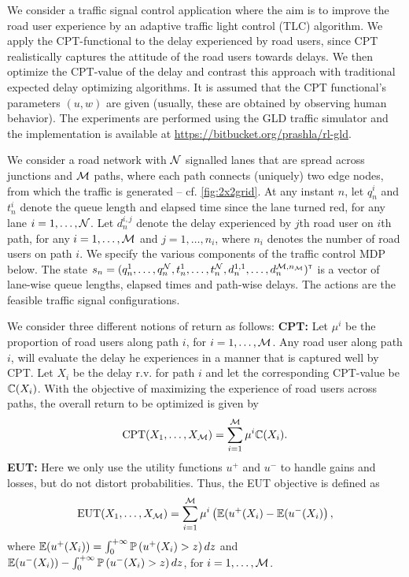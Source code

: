 We consider a traffic signal control application where the aim is to improve the road user experience by an adaptive traffic light control (TLC) algorithm.
We apply the CPT-functional to the delay experienced by road users, since CPT realistically captures the attitude of the road users towards delays. We then optimize the CPT-value of the delay and contrast this approach with traditional expected delay optimizing algorithms. It is assumed that the CPT functional's parameters $(u,w)$ are given (usually, these are obtained by observing human behavior). The experiments are performed using the GLD traffic simulator \cite{GLDSim} and the implementation is available at \url{https://bitbucket.org/prashla/rl-gld}.

We consider a road network with $\mathcal{N}$ signalled lanes that are spread across junctions and $\mathcal{M}$ paths, where each path connects (uniquely) two edge nodes, from which the traffic is generated -- cf. \cref{fig:2x2grid}. 
At any instant $n$, let $q_n^i$ and $t_n^i$ denote the queue length and elapsed time since the lane turned red, for any lane $i = 1,\ldots, \mathcal{N}$. Let $d_n^{i,j}$ denote the delay experienced by $j$th road user on $i$th path, for any $i=1,\ldots,\mathcal{M}$ and $j=1,\ldots,n_i$, where $n_i$ denotes the number of road users on path $i$.
We specify the various components of the traffic control MDP below.
The state $s_n=(q_n^1,\ldots,q_n^{\mathcal{N}},t_n^1,\ldots,t_n^{\mathcal{N}},d_n^{1,1},\ldots,d_n^{\mathcal{M},n_{\mathcal{M}}})^\mathsf{\scriptscriptstyle T}$ is a vector of lane-wise queue lengths, elapsed times and path-wise delays.
The actions are the feasible traffic signal configurations. 

We consider three different notions of return as follows:
%
\textbf{CPT:} Let $\mu^i$ be the proportion of road users along path $i$, for $i=1,\ldots,\mathcal{M}$. Any road user along path $i$, will evaluate the delay he experiences in a manner that is captured well by CPT. Let $X_i$ be the delay r.v. for path $i$ and let the corresponding CPT-value be $\mathbb{C}(X_i)$. With the objective of maximizing the experience of road users across paths, the overall return to be optimized is given by
\begin{align}
\text{CPT}(X_1,\ldots,X_{\mathcal{M}}) = \sum_{i=1}^{\mathcal{M}} \mu^i \mathbb{C}(X_i).\label{eq:cpt-traffic}
\end{align}
\textbf{EUT:} Here we only use the utility functions $u^+$ and $u^-$ to handle gains and losses, but do not distort probabilities. 
Thus, the EUT objective is defined as
\begin{align*}
\text{EUT}(X_1,\ldots,X_{\mathcal{M}}) = \sum_{i=1}^{\mathcal{M}} \mu^i \left(\mathbb{E}(u^+(X_i) - \mathbb{E}(u^-(X_i)\right),
\end{align*}
where $\mathbb{E}(u^+(X_i)) = \int_0^{+\infty} \mathbb{P}\left( u^+(X_i)>z \right) dz$ and $\mathbb{E}(u^-(X_i)) - \int_0^{+\infty} \mathbb{P}\left( u^-(X_i)>z \right) dz$, for $i=1,\ldots,\mathcal{M}$.

